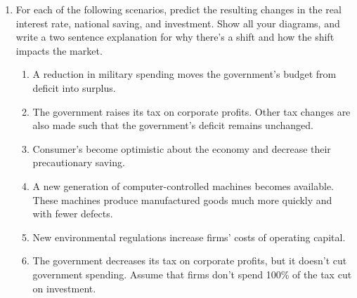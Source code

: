 \documentclass{article}
\begin{document}
\begin{enumerate}
\begin{enumerate}
	\item Now suppose that before the firm makes the decision, the prevailing interest rate on savings accounts increases to 12\%, but there is no change in the expected revenue from the investment. Does the machine remain a worthwhile investment?
	
	\item What is the maximum price the firm should be willing to pay for the machine if the interest rate on savings is 10\% (in other words, at what price is the firm indifferent between the two options)?
	
	\item Does a higher interest rate encourage or discourage investment? Does it encourage or discourage saving? 
	
	\end{enumerate}
	
\item For each of the following scenarios, predict the resulting changes in the real interest rate, national saving, and investment. Show all your diagrams, and write a two sentence explanation for why there's a shift and how the shift impacts the market.

	\begin{enumerate}
	
	\item A reduction in military spending moves the government’s budget from deficit into surplus.
	
	\item The government raises its tax on corporate profits. Other tax changes are also made such that the government’s deficit remains unchanged.
	
	\item Consumer's become optimistic about the economy and decrease their precautionary saving. 
	
	\item A new generation of computer-controlled machines becomes available. These machines produce manufactured goods much more quickly and with fewer defects.
	
	\item New environmental regulations increase firms’ costs of operating capital.
	
	\item The government decreases its tax on corporate profits, but it doesn't cut government spending. Assume that firms don't spend 100\% of the tax cut on investment.
	
	\end{enumerate}

\end{enumerate}
\end{document}
